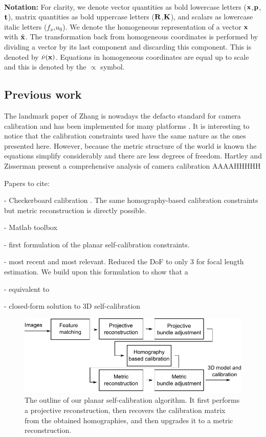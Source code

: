 \documentclass[10pt,twocolumn,letterpaper]{article}
\begin{document}
~\\ \noindent\textbf{Notation:}
For clarity, we denote vector quantities as bold lowercase letters (\eg $\mathbf{x}$,$\mathbf{p}$,$\mathbf{t}$), matrix quantities as bold uppercase letters (\eg $\mathbf{R}$,$\mathbf{K}$), and scalars as lowercase italic letters (\eg $f_x$,$u_0$). We denote the homogeneous representation of a vector $\mathbf{x}$ with $\hat{\mathbf{x}}$. The transformation back from homogeneous coordinates is performed by dividing a vector by its last component and discarding this component. This is denoted by $\check{\nu}(\mathbf{x})$. Equations in homogeneous coordinates are equal up to scale and this is denoted by the $\propto$ symbol.

\subsection{Previous work}

The landmark paper of Zhang \cite{zhang1999} is nowadays the defacto standard for camera calibration and has been implemented for many platforms \cite{bouguetMCT,opencv_library}. It is interesting to notice that the calibration constraints used have the same nature as the ones presented here. However, because the metric structure of the world is known the equations simplify considerably and there are less degrees of freedom. Hartley and Zisserman \cite{hartley2000} present a comprehensive analysis of camera calibration AAAAHHHHH

Papers to cite:

- Checkerboard calibration \cite{zhang1999}. The same homography-based calibration constraints but metric reconstruction is directly possible.

- Matlab toolbox \cite{bouguetMCT}

- \cite{triggs1998} first formulation of the planar self-calibration constraints.

- \cite{bocquillon2006} most recent and most relevant. Reduced the DoF to only 3 for focal length estimation. We build upon this formulation to show that a

- \cite{gurdjos2003} equivalent to \cite{bocquillon2006}

- \cite{bougnoux1998} closed-form solution to 3D self-calibration

\begin{figure}
\includegraphics[width=\linewidth]{images/pipeline.pdf}
\caption{The outline of our planar self-calibration algorithm. It first performs a projective reconstruction, then recovers the calibration matrix from the obtained homographies, and then upgrades it to a metric reconstruction.}
\label{fig:diagram}
\end{figure}
\end{document}

